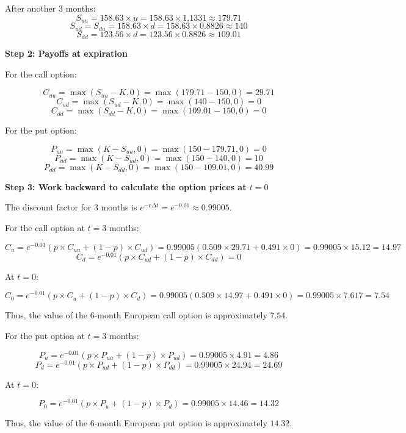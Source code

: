 \documentclass[12pt,letterpaper, onecolumn]{exam}
\begin{document}
\begin{solution}
After another 3 months:
\[
S_{uu} = 158.63 \times u = 158.63 \times 1.1331 \approx 179.71
\]
\[
S_{ud} = S_{du} = 158.63 \times d = 158.63 \times 0.8826 \approx 140
\]
\[
S_{dd} = 123.56 \times d = 123.56 \times 0.8826 \approx 109.01
\]

\textbf{Step 2: Payoffs at expiration}

For the call option:

\[
C_{uu} = \max(S_{uu} - K, 0) = \max(179.71 - 150, 0) = 29.71
\]
\[
C_{ud} = \max(S_{ud} - K, 0) = \max(140 - 150, 0) = 0
\]
\[
C_{dd} = \max(S_{dd} - K, 0) = \max(109.01 - 150, 0) = 0
\]

For the put option:

\[
P_{uu} = \max(K - S_{uu}, 0) = \max(150 - 179.71, 0) = 0
\]
\[
P_{ud} = \max(K - S_{ud}, 0) = \max(150 - 140, 0) = 10
\]
\[
P_{dd} = \max(K - S_{dd}, 0) = \max(150 - 109.01, 0) = 40.99
\]

\textbf{Step 3: Work backward to calculate the option prices at \( t = 0 \)}

The discount factor for 3 months is \( e^{-r \Delta t} = e^{-0.01} \approx 0.99005 \).

For the call option at \( t = 3 \) months:

\[
C_u = e^{-0.01} \left( p \times C_{uu} + (1 - p) \times C_{ud} \right) = 0.99005 \left( 0.509 \times 29.71 + 0.491 \times 0 \right) = 0.99005 \times 15.12 = 14.97
\]
\[
C_d = e^{-0.01} \left( p \times C_{ud} + (1 - p) \times C_{dd} \right) = 0
\]

At \( t = 0 \):

\[
C_0 = e^{-0.01} \left( p \times C_u + (1 - p) \times C_d \right) = 0.99005 \left( 0.509 \times 14.97 + 0.491 \times 0 \right) = 0.99005 \times 7.617 = 7.54
\]

Thus, the value of the 6-month European call option is approximately \( \boxed{7.54} \).

For the put option at \( t = 3 \) months:

\[
P_u = e^{-0.01} \left( p \times P_{uu} + (1 - p) \times P_{ud} \right) = 0.99005 \times 4.91 = 4.86
\]
\[
P_d = e^{-0.01} \left( p \times P_{ud} + (1 - p) \times P_{dd} \right) = 0.99005 \times 24.94 = 24.69
\]

At \( t = 0 \):

\[
P_0 = e^{-0.01} \left( p \times P_u + (1 - p) \times P_d \right) = 0.99005 \times 14.46 = 14.32
\]

Thus, the value of the 6-month European put option is approximately \( \boxed{14.32} \).

\end{solution}
\end{document}
